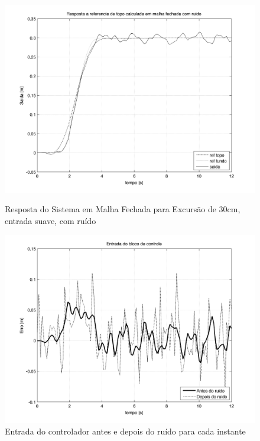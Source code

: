 \begin{figure}[!htb]
    \centering
    \begin{minipage}{.45\textwidth}
        \centering
        
        \includegraphics[width=1\linewidth]{figs/resultados/simulacao/respostaMalhaAbertaRefTopoRuido}
        \caption{Resposta do Sistema em Malha Fechada para Excursão de 30cm, entrada suave, com ruído\label{respostaMalhaAbertaRefTopoRuido}}
    \end{minipage}%
    \hspace{0.1cm}
    \begin{minipage}{0.45\textwidth}
        \centering
               \includegraphics[width=1\linewidth]{figs/resultados/simulacao/entradaControladorYERR}
        \caption{Entrada do controlador antes e depois do ruído para cada instante\label{entradaControladorYERR}}

    \end{minipage}
\end{figure}


